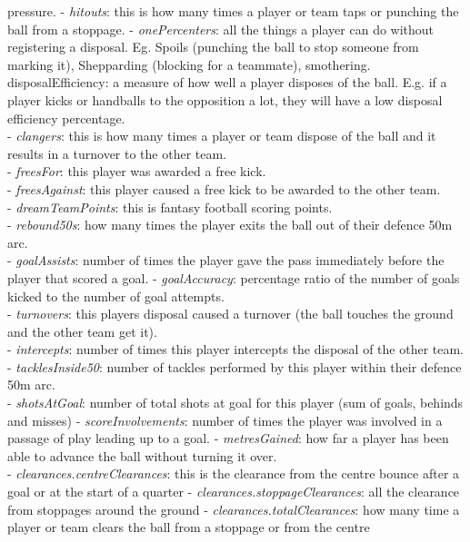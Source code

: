 pressure. - \emph{hitouts}: this is how many times a player or team taps
or punching the ball from a stoppage. - \emph{onePercenters}: all the
things a player can do without registering a disposal. Eg. Spoils
(punching the ball to stop someone from marking it), Shepparding
(blocking for a teammate), smothering.\\
disposalEfficiency: a measure of how well a player disposes of the ball.
E.g. if a player kicks or handballs to the opposition a lot, they will
have a low disposal efficiency percentage.\\
- \emph{clangers}: this is how many times a player or team dispose of
the ball and it results in a turnover to the other team.\\
- \emph{freesFor}: this player was awarded a free kick.\\
- \emph{freesAgainst}: this player caused a free kick to be awarded to
the other team.\\
- \emph{dreamTeamPoints}: this is fantasy football scoring points.\\
- \emph{rebound50s}: how many times the player exits the ball out of
their defence 50m arc.\\
- \emph{goalAssists}: number of times the player gave the pass
immediately before the player that scored a goal. - \emph{goalAccuracy}:
percentage ratio of the number of goals kicked to the number of goal
attempts.\\
- \emph{turnovers}: this players disposal caused a turnover (the ball
touches the ground and the other team get it).\\
- \emph{intercepts}: number of times this player intercepts the disposal
of the other team. - \emph{tacklesInside50}: number of tackles performed
by this player within their defence 50m arc.\\
- \emph{shotsAtGoal}: number of total shots at goal for this player (sum
of goals, behinds and misses) - \emph{scoreInvolvements}: number of
times the player was involved in a passage of play leading up to a goal.
- \emph{metresGained}: how far a player has been able to advance the
ball without turning it over.\\
- \emph{clearances.centreClearances}: this is the clearance from the
centre bounce after a goal or at the start of a quarter -
\emph{clearances.stoppageClearances}: all the clearance from stoppages
around the ground - \emph{clearances.totalClearances}: how many time a
player or team clears the ball from a stoppage or from the centre

